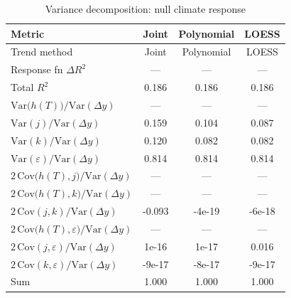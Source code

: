 \begin{table}[htbp]
\centering
\caption{Variance decomposition: null climate response}
\label{tab:variance_decomp_null}

\small
\begin{tabular}{@{}lccc@{}}
\toprule
Metric & Joint & Polynomial & LOESS \\
\midrule
Trend method & Joint & Polynomial & LOESS \\
\midrule
Response fn $\Delta R^2$ & — & — & — \\
Total $R^2$ & 0.186 & 0.186 & 0.186 \\
\midrule
$\mathrm{Var}\!\big(h(T)\big)/\mathrm{Var}(\Delta y)$ & — & — & — \\
$\mathrm{Var}(j)/\mathrm{Var}(\Delta y)$ & 0.159 & 0.104 & 0.087 \\
$\mathrm{Var}(k)/\mathrm{Var}(\Delta y)$ & 0.120 & 0.082 & 0.082 \\
$\mathrm{Var}(\varepsilon)/\mathrm{Var}(\Delta y)$ & 0.814 & 0.814 & 0.814 \\
\midrule
$2\,\mathrm{Cov}\!\big(h(T),j\big)/\mathrm{Var}(\Delta y)$ & — & — & — \\
$2\,\mathrm{Cov}\!\big(h(T),k\big)/\mathrm{Var}(\Delta y)$ & — & — & — \\
$2\,\mathrm{Cov}(j,k)/\mathrm{Var}(\Delta y)$ & -0.093 & -4e-19 & -6e-18 \\
$2\,\mathrm{Cov}\!\big(h(T),\varepsilon\big)/\mathrm{Var}(\Delta y)$ & — & — & — \\
$2\,\mathrm{Cov}(j,\varepsilon)/\mathrm{Var}(\Delta y)$ & 1e-16 & 1e-17 & 0.016 \\
$2\,\mathrm{Cov}(k,\varepsilon)/\mathrm{Var}(\Delta y)$ & -9e-17 & -8e-17 & -9e-17 \\
\midrule
Sum & 1.000 & 1.000 & 1.000 \\
\bottomrule
\end{tabular}
\end{table}